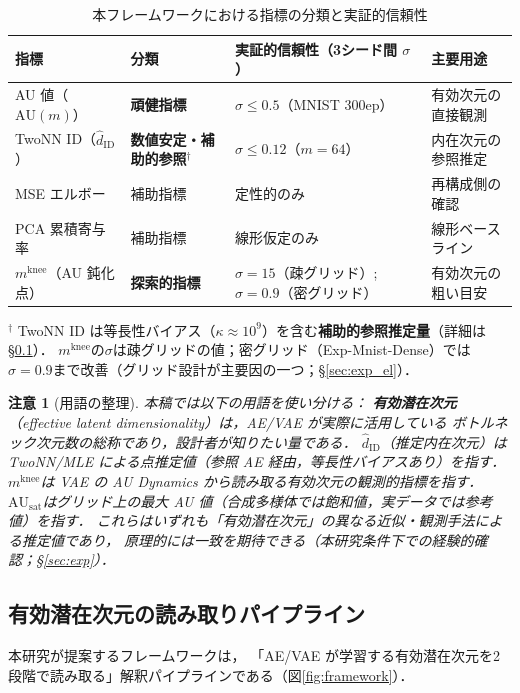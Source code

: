\documentclass[11pt,a4paper]{jsarticle}
\newtheorem{remark}{注意}
\newcommand{\kap}{\kappa}
\newcommand{\AUsat}{\mathrm{AU}_{\mathrm{sat}}}
\newcommand{\mknee}{m^{\mathrm{knee}}}
\begin{document}
\begin{table}[H]
\centering
\caption{本フレームワークにおける指標の分類と実証的信頼性}
\label{tab:indicator_class}
\small
\begin{tabular}{p{3.5cm}p{3.2cm}p{4.0cm}p{4.0cm}}
\toprule
指標 & 分類 & 実証的信頼性（3シード間 $\sigma$） & 主要用途 \\
\midrule
AU 値（$\mathrm{AU}(m)$） & \textbf{頑健指標} & $\sigma \leq 0.5$（MNIST 300ep） & 有効次元の直接観測 \\
TwoNN ID（$\hat{d}_\mathrm{ID}$） & \textbf{数値安定・補助的参照}$^\dagger$ & $\sigma \leq 0.12$（$m=64$） & 内在次元の参照推定 \\
MSE エルボー & 補助指標 & 定性的のみ & 再構成側の確認 \\
PCA 累積寄与率 & 補助指標 & 線形仮定のみ & 線形ベースライン \\
$\mknee$（AU 鈍化点） & \textbf{探索的指標} & $\sigma=15$（疎グリッド）; $\sigma=0.9$（密グリッド） & 有効次元の粗い目安 \\
\bottomrule
\end{tabular}
\medskip
\footnotesize
$^\dagger$ TwoNN ID は等長性バイアス（$\kap \approx 10^9$）を含む\textbf{補助的参照推定量}（詳細は§\ref{sec:framework_pipeline}）．
$\mknee$の$\sigma$は疎グリッドの値；密グリッド（Exp-Mnist-Dense）では$\sigma=0.9$まで改善（グリッド設計が主要因の一つ；§\ref{sec:exp_el}）．
\normalsize
\end{table}

\begin{remark}[用語の整理]
本稿では以下の用語を使い分ける：
\textbf{有効潜在次元}（effective latent dimensionality）は，AE/VAE が実際に活用している
ボトルネック次元数の総称であり，設計者が知りたい量である．
\textbf{$\hat{d}_\mathrm{ID}$}（推定内在次元）は TwoNN/MLE による点推定値（参照 AE 経由，等長性バイアスあり）を指す．
\textbf{$\mknee$}は VAE の AU Dynamics から読み取る有効次元の観測的指標を指す．
\textbf{$\AUsat$}はグリッド上の最大 AU 値（合成多様体では飽和値，実データでは参考値）を指す．
これらはいずれも「有効潜在次元」の異なる近似・観測手法による推定値であり，
原理的には一致を期待できる（本研究条件下での経験的確認；§\ref{sec:exp}）．
\end{remark}

\subsection{有効潜在次元の読み取りパイプライン}\label{sec:framework_pipeline}

本研究が提案するフレームワークは，
「AE/VAE が学習する有効潜在次元を2段階で読み取る」解釈パイプラインである（図\ref{fig:framework}）．
\end{document}
